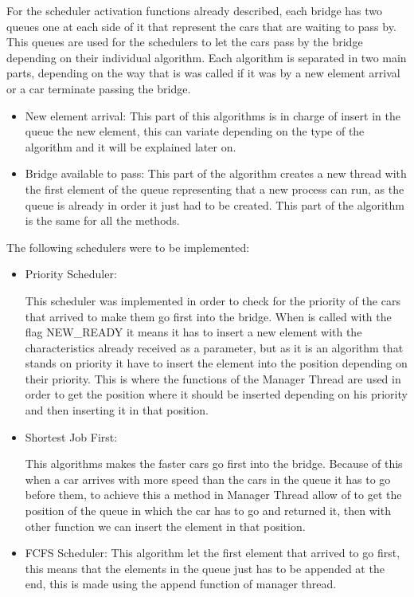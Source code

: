 \documentclass[a4paper,9pt]{article}
\begin{document}
\begin{itemize}
\begin{itemize}
\end{itemize}

For the scheduler activation functions already described, each bridge has two queues one at each side of it that represent the cars that are waiting to pass by. This queues are used for the schedulers to let the cars pass by the bridge depending on their individual algorithm. Each algorithm is separated in two main parts, depending on the way that is was called if it was by a new element arrival or a car terminate passing the bridge.
\begin{itemize}
\item New element arrival: This part of this algorithms is in charge of insert in the queue the new element, this can variate depending on the type of the algorithm and it will be explained later on. 
\item Bridge available to pass: This part of the algorithm creates a new thread with the first element of the queue representing that a new process can run, as the  queue is already in order it just had to be created. This part of the algorithm is the same for all the methods.
\end{itemize}

The following schedulers were to be implemented:
\begin{itemize}
\item Priority Scheduler:

This scheduler was implemented in order to check for the priority of the cars that arrived to make them go first into the bridge. When is called with the flag NEW\_READY it means it has to insert a new element with the characteristics already received as a parameter, but as it is an algorithm that stands on priority it have to insert the element into the position depending on their priority. This is where the functions of the Manager Thread are used in order to get the position where it should be inserted depending on his priority and then inserting it in that position.  


\item Shortest Job First:

This algorithms makes the faster cars go first into the bridge. Because of this when a car arrives with more speed than the cars in the queue it has to go before them, to achieve this a method in Manager Thread allow of to get the position of the queue in which the car has to go and returned it, then with other function we can insert the element in that position. 


\item FCFS Scheduler:
This algorithm let the first element that arrived to go first, this means that the elements in the queue just has to be appended at the end, this is made using the append function of manager thread.



\end{itemize}
\end{itemize}
\end{document}
